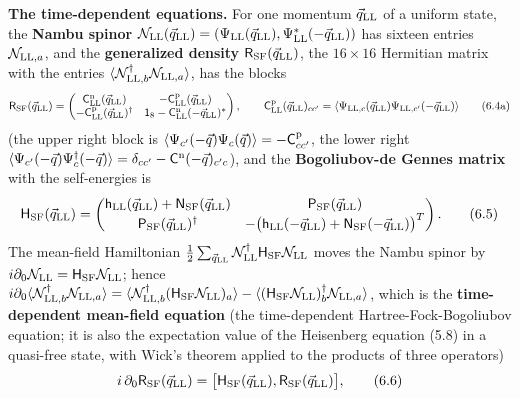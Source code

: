 \documentclass[
  10pt,
]{article}
\begin{document}
\textbf{The time-dependent equations.} For one momentum
\(\vec q_{\rm LL}\) of a uniform state, the \textbf{Nambu spinor}
\(\mathcal N_{\rm LL}(\vec q_{\rm LL})=(\Psi_{\rm LL}(\vec q_{\rm LL}),\Psi^*_{\rm LL}(-\vec q_{\rm LL}))\)
has sixteen entries \(\mathcal N_{{\rm LL},a}\), and the
\textbf{generalized density} \(\mathsf R_{\rm SF}(\vec q_{\rm LL})\),
the \(16\times16\) Hermitian matrix with the entries
\(\langle\mathcal N_{{\rm LL},b}^\dagger\mathcal N_{{\rm LL},a}\rangle\),
has the blocks
\[\mathsf R_{\rm SF}(\vec q_{\rm LL})=\begin{pmatrix}\mathsf C^{\rm n}_{\rm LL}(\vec q_{\rm LL})&-\mathsf C^{\rm p}_{\rm LL}(\vec q_{\rm LL})\\-\mathsf C^{\rm p}_{\rm LL}(\vec q_{\rm LL})^\dagger&\mathsf 1_8-\mathsf C^{\rm n}_{\rm LL}(-\vec q_{\rm LL})^*\end{pmatrix},\qquad\mathsf C^{\rm p}_{\rm LL}(\vec q_{\rm LL})_{cc'}=\langle\Psi_{{\rm LL},c}(\vec q_{\rm LL})\Psi_{{\rm LL},c'}(-\vec q_{\rm LL})\rangle\tag{6.4a}\]
(the upper right block is
\(\langle\Psi_{c'}(-\vec q)\Psi_c(\vec q)\rangle=-\mathsf C^{\rm p}_{cc'}\),
the lower right
\(\langle\Psi_{c'}(-\vec q)\Psi^\dagger_c(-\vec q)\rangle=\delta_{cc'}-\mathsf C^{\rm n}(-\vec q)_{c'c}\)),
and the \textbf{Bogoliubov-de Gennes matrix} with the self-energies is
\[\mathsf H_{\rm SF}(\vec q_{\rm LL})=\begin{pmatrix}\mathsf h_{\rm LL}(\vec q_{\rm LL})+\mathsf N_{\rm SF}(\vec q_{\rm LL})&\mathsf P_{\rm SF}(\vec q_{\rm LL})\\\mathsf P_{\rm SF}(\vec q_{\rm LL})^\dagger&-\big(\mathsf h_{\rm LL}(-\vec q_{\rm LL})+\mathsf N_{\rm SF}(-\vec q_{\rm LL})\big)^T\end{pmatrix}.\tag{6.5}\]
The mean-field Hamiltonian
\(\tfrac12\sum_{\vec q_{\rm LL}}\mathcal N_{\rm LL}^\dagger\mathsf H_{\rm SF}\mathcal N_{\rm LL}\)
moves the Nambu spinor by
\(i\partial_0\mathcal N_{\rm LL}=\mathsf H_{\rm SF}\mathcal N_{\rm LL}\);
hence
\(i\partial_0\langle\mathcal N_{{\rm LL},b}^\dagger\mathcal N_{{\rm LL},a}\rangle=\langle\mathcal N_{{\rm LL},b}^\dagger(\mathsf H_{\rm SF}\mathcal N_{\rm LL})_a\rangle-\langle(\mathsf H_{\rm SF}\mathcal N_{\rm LL})_b^\dagger\mathcal N_{{\rm LL},a}\rangle\),
which is the \textbf{time-dependent mean-field equation} (the
time-dependent Hartree-Fock-Bogoliubov equation; it is also the
expectation value of the Heisenberg equation (5.8) in a quasi-free
state, with Wick's theorem applied to the products of three operators)
\[i\,\partial_0\mathsf R_{\rm SF}(\vec q_{\rm LL})=\big[\mathsf H_{\rm SF}(\vec q_{\rm LL}),\mathsf R_{\rm SF}(\vec q_{\rm LL})\big],\tag{6.6}\]
\end{document}
